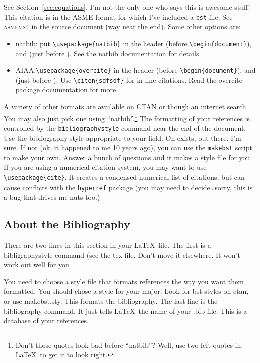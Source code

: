 \documentclass[12pt]{report}
\begin{document}
See Section~\ref{sec:equations}. I'm not the only one who says this is awesome stuff\cite{Mortara2004}!
This citation is in the ASME format for which I've included a \verb'bst'
file. See \textsc{asmems4} in the source document (way near the end). Some  other options are:
\begin{itemize}
\item natbib:  put \verb'\usepackage{natbib}' in the header (before \verb'\begin{document}'), and \verb'' (just before \verb'').  See the natbib documentation for details.
\item AIAA:\@put \verb'\usepackage{overcite}' in the header (before \verb'\begin{document}'), and \verb'' (just before \verb''). Use \verb'\citen{sdfsdf}' for in-line citations. Read the overcite package documentation for more.
\end{itemize}

A variety of other formats are available on \href{http://www.ctan.org}{CTAN} or though an internet search. You may also just pick one using ``natbib''.\footnote{Don't those quotes look bad before ``natbib''? Well, use two left quotes in \LaTeX\ to get it to look right.}  The formatting of your references is controlled by the \verb'bibliographystyle' command near the end of the document. Use the bibliography style appropriate to your field. On exists, out there. I'm sure. If not (ok, it happened to me 10 years ago), you can use the \verb'makebst' script to make your own. Answer a bunch of questions and it makes a style file for you. If you are using a numerical citation system, you may want to use \verb'\usepackage{cite}'. It creates a condensed numerical list of citations, but can cause conflicts with the \verb'hyperref' package (you may need to decide\ldots sorry, this is a bug that drives me nuts too.)

\subsection{About the Bibliography}
There are two lines in this section in your \LaTeX\ file. The first is a bibligraphystyle command (see the \textsf{tex} file. Don't move it elsewhere. It won't work out well for you.

You need to choose a style file that formats references the way you want them formatted.  You should chose a style for your major.  Look for bst styles on ctan, or use makebst.sty. This formats the bibliography.
The last line is the bibliography command. It just tells \LaTeX\  the name of your \textsf{.bib} file. This is a database of your references.
\end{document}
